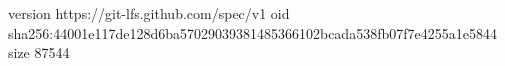 version https://git-lfs.github.com/spec/v1
oid sha256:44001e117de128d6ba57029039381485366102bcada538fb07f7e4255a1e5844
size 87544
